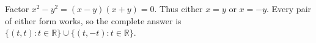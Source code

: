 Factor $x^2-y^2=(x-y)(x+y)=0$. Thus either $x=y$ or $x=-y$. Every pair of either form works, so the complete answer is $\boxed{\{(t,t):t\in\mathbb R\}\cup\{(t,-t):t\in\mathbb R\}}$.
